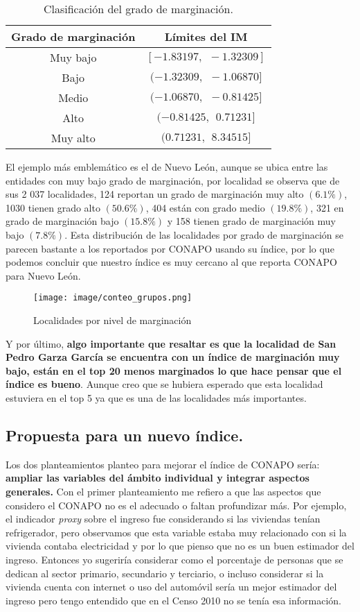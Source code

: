 \documentclass[paper=letter, fontsize=11pt]{scrartcl}
\numberwithin{equation}{section} %
\numberwithin{figure}{section} %
\numberwithin{table}{section} %
\begin{document}
\begin{table}[H]
    \centering
    \begin{tabular}{cc}
        Grado de marginación & Límites del IM \\ \hline \hline
        Muy bajo & $[-1.83197, \ \ -1.32309]$\\
        Bajo & $(-1.32309, \ \  -1.06870]$\\
        Medio & $(-1.06870, \ \ -0.81425]$\\
        Alto & $(-0.81425, \ \ 0.71231]$\\
        Muy alto& $(0.71231, \ \ 8.34515]$\\ \hline \hline
    \end{tabular}
    \caption{Clasificación del grado de marginación.}
    \label{tab:limites_marginacion}
\end{table}
El ejemplo más emblemático es el de Nuevo León, aunque se ubica entre las entidades con muy bajo grado de marginación, por localidad se observa que de sus 2 037 localidades, 124 reportan un grado de marginación muy alto $(6.1\%)$, 1030 tienen grado alto $(50.6\%)$, 404 están con grado medio $(19.8\%)$, 321 en grado de marginación bajo $(15.8\%)$ y 158 tienen grado de marginación muy bajo $(7.8\%)$. Esta distribución de las localidades por grado de marginación se parecen bastante a los reportados por CONAPO usando su índice, por lo que podemos concluir que nuestro índice es muy cercano al que reporta CONAPO para Nuevo León.
\begin{figure}[H]
    \centering
    \texttt{[image: image/conteo\_grupos.png]}
    \caption{Localidades por nivel de marginación}
    \label{fig:conteo_grupos}
\end{figure}
Y por último, \textbf{algo importante que resaltar es que la localidad de San Pedro Garza García se encuentra con un índice de marginación muy bajo, están en el top 20 menos marginados lo que hace pensar que el índice es bueno}. Aunque creo que se hubiera esperado que esta localidad estuviera en el top 5 ya que es una de las localidades más importantes.

\subsection{Propuesta para un nuevo índice.}
Los dos planteamientos planteo para mejorar el índice de CONAPO sería: \textbf{ampliar las variables del ámbito individual y integrar aspectos generales.} Con el primer planteamiento me refiero a que las aspectos que considero el CONAPO no es el adecuado o faltan profundizar más. Por ejemplo, el indicador \textit{proxy} sobre el ingreso fue considerando si las viviendas tenían refrigerador, pero observamos que esta variable estaba muy relacionado con si la vivienda contaba electricidad y por lo que pienso que no es un buen estimador del ingreso. Entonces yo sugeriría considerar como el porcentaje de personas que se dedican al sector primario, secundario y terciario, o incluso considerar si la vivienda cuenta con internet o uso del automóvil sería un mejor estimador del ingreso pero tengo entendido que en el Censo 2010 no se tenía esa información. \\  
\end{document}
